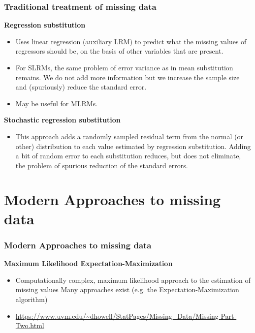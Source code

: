 \documentclass{beamer}
\begin{document}
\begin{frame}
\frametitle{Traditional treatment of missing data}
\textbf{Regression substitution}
  \begin{itemize}
  \item Uses linear regression (auxiliary LRM) to predict what the missing values of regressors should be, on the basis of other variables that are present.
  \item For SLRMs, the same problem of error variance as in mean substitution remains. We do not add more information but we increase the sample size and (spuriously) reduce the standard error.
  \item May be useful for MLRMs.
   \end{itemize}
  \vspace{0.2cm}
\textbf{Stochastic regression substitution}
  \begin{itemize}
  \item This approach adds a randomly sampled residual term from the normal (or other) distribution to each value estimated by regression substitution. Adding a bit of random error to each substitution reduces, but does not eliminate, the problem of spurious reduction of the standard errors.
   \end{itemize}
\end{frame}
\section{Modern Approaches to missing data}
\begin{frame}
\frametitle{Modern Approaches to missing data}

\textbf{Maximum Likelihood Expectation-Maximization}
  \begin{itemize}
  \item Computationally complex, maximum likelihood approach to the estimation of missing values Many approaches exist (e.g. the Expectation-Maximization algorithm)
  \item[] \scriptsize{\url{https://www.uvm.edu/~dhowell/StatPages/Missing_Data/Missing-Part-Two.html}}
   \end{itemize}
 
\end{frame}
\end{document}
